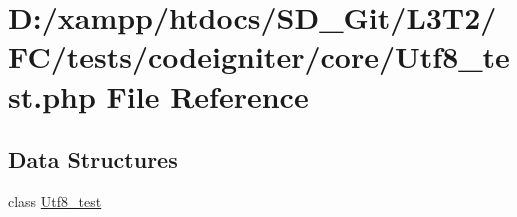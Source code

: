 \hypertarget{tests_2codeigniter_2core_2_utf8__test_8php}{}\section{D\+:/xampp/htdocs/\+S\+D\+\_\+\+Git/\+L3\+T2/\+F\+C/tests/codeigniter/core/\+Utf8\+\_\+test.php File Reference}
\label{tests_2codeigniter_2core_2_utf8__test_8php}
\subsection*{Data Structures}
\begin{DoxyCompactItemize}
\item 
class \hyperlink{class_utf8__test}{Utf8\+\_\+test}
\end{DoxyCompactItemize}
